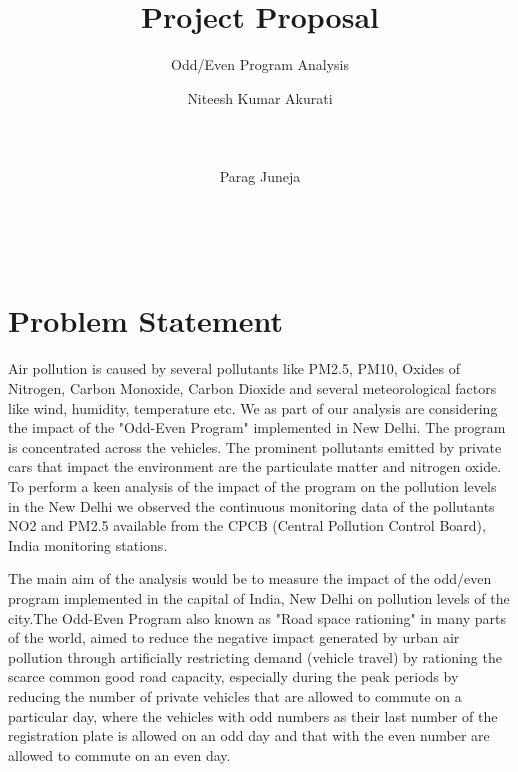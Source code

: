 \documentclass{acm_proc_article-sp}
\begin{document}
\title{Project Proposal}
\subtitle{Odd/Even Program Analysis}

\author{
\alignauthor
Niteesh Kumar Akurati\\
       \\
       \\
       \\
\alignauthor
Parag Juneja\\
       \\
       \\
       \\
}

\maketitle

\section{Problem Statement}
Air pollution is caused by several pollutants like PM2.5, PM10, Oxides of Nitrogen, Carbon Monoxide, Carbon Dioxide and several meteorological factors like wind, humidity, temperature etc. We as part of our analysis are considering the impact of the "Odd-Even Program" implemented in New Delhi. The program is concentrated across the vehicles. The prominent pollutants emitted by private cars that impact the environment are the particulate matter and nitrogen oxide. To perform a keen analysis of the impact of the program on the pollution levels in the New Delhi we observed the continuous monitoring data of the pollutants NO2 and PM2.5 available from the CPCB (Central Pollution Control Board), India monitoring stations.

The main aim of the analysis would be to measure the impact of the odd/even program implemented in the capital of India, New Delhi on pollution levels of the city.The Odd-Even Program also known as "Road space rationing" in many parts of the world, aimed to reduce the negative impact generated by urban air pollution through artificially restricting demand (vehicle travel) by rationing the scarce common good road capacity, especially during the peak periods by reducing the number of private vehicles that are allowed to commute on a particular day, where the vehicles with odd numbers as their last number of the registration plate is allowed on an odd day and that with the even number are allowed to commute on an even day.
\end{document}
